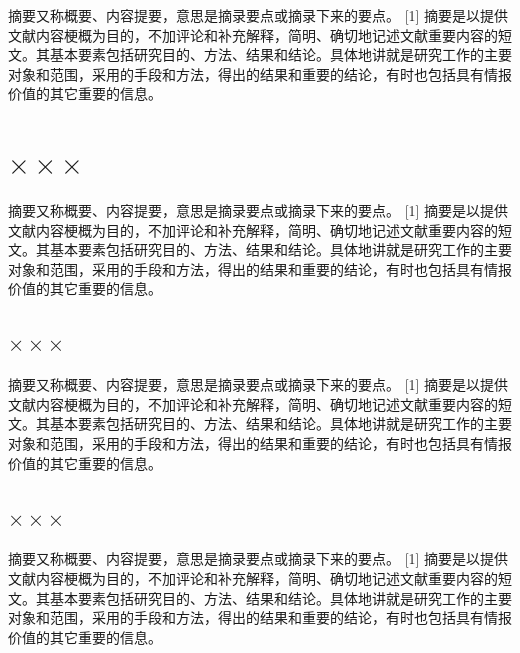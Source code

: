 \documentclass[12pt,oneside,a4paper,fleqn]{ctexart}
\begin{document}
\begin{spacing}{1.25}
摘要又称概要、内容提要，意思是摘录要点或摘录下来的要点。 [1]  摘要是以提供文献内容梗概为目的，不加评论和补充解释，简明、确切地记述文献重要内容的短文。其基本要素包括研究目的、方法、结果和结论。具体地讲就是研究工作的主要对象和范围，采用的手段和方法，得出的结果和重要的结论，有时也包括具有情报价值的其它重要的信息。

\end{spacing}\vspace{0.5em} \section{\heiti $\times \times \times $} \vspace{0.5em}\begin{spacing}{1.25}

摘要又称概要、内容提要，意思是摘录要点或摘录下来的要点。 [1]  摘要是以提供文献内容梗概为目的，不加评论和补充解释，简明、确切地记述文献重要内容的短文。其基本要素包括研究目的、方法、结果和结论。具体地讲就是研究工作的主要对象和范围，采用的手段和方法，得出的结果和重要的结论，有时也包括具有情报价值的其它重要的信息。

\end{spacing}\vspace{0.5em} \subsection{\heiti $\times \times \times $}\begin{spacing}{1.25}

摘要又称概要、内容提要，意思是摘录要点或摘录下来的要点。 [1]  摘要是以提供文献内容梗概为目的，不加评论和补充解释，简明、确切地记述文献重要内容的短文。其基本要素包括研究目的、方法、结果和结论。具体地讲就是研究工作的主要对象和范围，采用的手段和方法，得出的结果和重要的结论，有时也包括具有情报价值的其它重要的信息。



\end{spacing}\vspace{0.5em} \subsection{\heiti $\times \times \times $}\begin{spacing}{1.25}

摘要又称概要、内容提要，意思是摘录要点或摘录下来的要点。 [1]  摘要是以提供文献内容梗概为目的，不加评论和补充解释，简明、确切地记述文献重要内容的短文。其基本要素包括研究目的、方法、结果和结论。具体地讲就是研究工作的主要对象和范围，采用的手段和方法，得出的结果和重要的结论，有时也包括具有情报价值的其它重要的信息。


\end{spacing}
\end{document}
